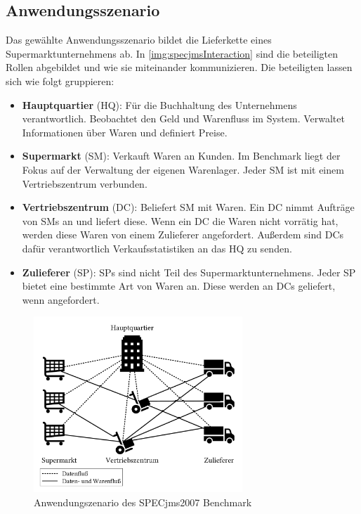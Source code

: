 \subsection{Anwendungsszenario}
Das gewählte Anwendungsszenario bildet die Lieferkette eines Supermarktunternehmens ab. In \autoref{img:specjmsInteraction} sind die beteiligten Rollen abgebildet und wie sie miteinander kommunizieren. Die beteiligten lassen sich wie folgt gruppieren: 
\begin{itemize}
    \item \textbf{Hauptquartier} (HQ): Für die Buchhaltung des Unternehmens verantwortlich. Beobachtet den Geld und Warenfluss im System. Verwaltet Informationen über Waren und definiert Preise.
    \item \textbf{Supermarkt} (SM): Verkauft Waren an Kunden. Im Benchmark liegt der Fokus auf der Verwaltung der eigenen Warenlager. Jeder SM ist mit einem Vertriebszentrum verbunden.
    \item \textbf{Vertriebszentrum} (DC): Beliefert SM mit Waren. Ein DC nimmt Aufträge von SMs an und liefert diese. Wenn ein DC die Waren nicht vorrätig hat, werden diese Waren von einem Zulieferer angefordert. Außerdem sind DCs dafür verantwortlich Verkaufsstatistiken an das HQ zu senden.
    \item \textbf{Zulieferer} (SP): SPs sind nicht Teil des Supermarktunternehmens. Jeder SP bietet eine bestimmte Art von Waren an. Diese werden an DCs geliefert, wenn angefordert.
\end{itemize}

\begin{figure}
\center
  \includegraphics[width=0.7\textwidth]{images/evaluation/specjms/specjmsOverview.pdf}
  \caption{Anwendungszenario des SPECjms2007 Benchmark}
  \label{img:specjmsInteraction}
\end{figure}

